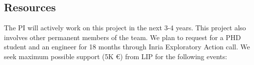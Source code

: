 %
%
%	


\subsection*{Resources}

The PI will actively work on this project in the next 3-4 years. This project also involves other permanent members of the team. We plan to request for a PHD student and an engineer for 18 months through Inria Exploratory Action call. We seek maximum possible support (5K \euro) from LIP for the following events:


